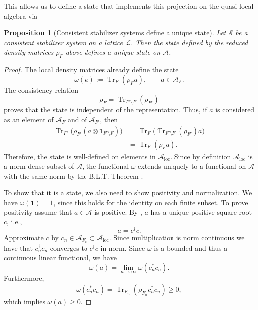 \documentclass[aps,pra,reprint,superscriptaddress]{revtex4-2}
\newcommand{\cA}{{\mathcal A}}
\newcommand{\cL}{{\mathcal L}}
\newcommand{\cS}{{\mathcal S}}
\newcommand\w{\omega}
\newcommand{\id}{\mathbf 1}
\newtheorem{proposition}[theorem]{Proposition}
\theoremstyle{definition}
\theoremstyle{remark}
\begin{document}
This allows us to define a state that implements this projection on the
quasi-local algebra via
\begin{proposition}[Consistent stabilizer systems define a unique state]\label{prop:define_state}
    Let $\cS$ be a consistent stabilizer system on a lattice $\cL$. Then the
    state defined by the reduced density matrices $\rho_F$ above defines a
    unique state on $\cA$.
\end{proposition}
\begin{proof}
    The local density matrices already define the state
    \begin{equation}
        \w(a):=\operatorname{Tr}_F(\rho_Fa),
        \qquad a\in\cA_F.
    \end{equation}
    The consistency relation
    \begin{equation}
        \rho_F=\operatorname{Tr}_{F'\setminus F}(\rho_{F'})
    \end{equation}
    proves that the state is independent of the representation. Thus, if
    $a$ is considered as an element of $\cA_F$ and of $\cA_{F'}$, then
    \begin{align}
        \operatorname{Tr}_{F'}\bigl(\rho_{F'}(a\otimes\id_{F'\setminus F})\bigr)
        &=\operatorname{Tr}_F\bigl(\operatorname{Tr}_{F'\setminus F}(\rho_{F'})a\bigr) \\
        &=\operatorname{Tr}_F(\rho_Fa).
        \nonumber
    \end{align}
    Therefore, the state is well-defined on elements in $\cA_{\text{loc}}$.
    Since by definition $\cA_{\text{loc}}$ is a norm-dense subset of $\cA$,
    the functional $\w$ extends uniquely to a functional on $\cA$ with the same
    norm by the B.L.T. Theorem \cite[Thm.~I.7]{ReedSimon1972}.

    To show that it is a state, we also need to show positivity and
    normalization. We have $\w(\id) = 1$, since this holds for the identity on
    each finite subset. To prove positivity assume that $a\in\cA$ is positive. By
    \cite[Proposition~II.3.1.2(vii)]{Blackadar}, $a$ has a unique positive
    square root $c$, i.e.,
    \begin{equation}
        a=c^\dagger c.
    \end{equation}
    Approximate $c$ by $c_n\in\cA_{F_n}\subset\cA_{\text{loc}}$. Since multiplication is norm continuous we have that $c^\dagger_n c_n$ converges to $c^\dagger c$ in norm.
    Since $\w$ is a bounded and thus a continuous linear functional, we have
    \begin{equation}
        \w(a)=\lim_{n\to\infty}\w(c_n^*c_n).
    \end{equation}
    Furthermore,
    \begin{equation}
        \w(c_n^*c_n)
        =\operatorname{Tr}_{F_n}(\rho_{F_n}c_n^*c_n)\geq0,
    \end{equation}
    which implies $\w(a)\geq0$. 
\end{proof}
\end{document}
